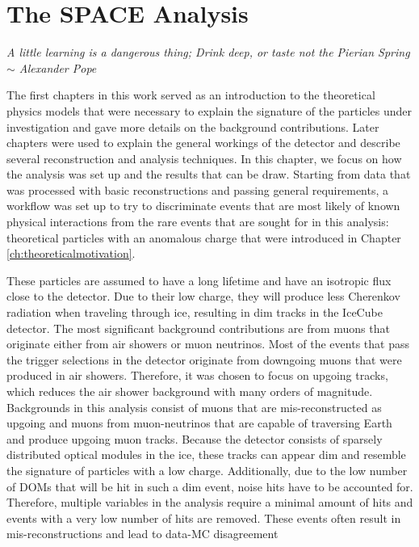 \chapter{The SPACE Analysis}
\label{ch:space}
\begin{flushright}
\textit{A little learning is a dangerous thing; Drink deep, or taste not the Pierian Spring \\$\sim$ Alexander Pope}
\end{flushright}

\noindent The first chapters in this work served as an introduction to the theoretical physics models that were necessary to explain the signature of the particles under investigation and gave more details on the background contributions. Later chapters were used to explain the general workings of the detector and describe several reconstruction and analysis techniques. In this chapter, we focus on how the analysis was set up and the results that can be draw. Starting from data that was processed with basic reconstructions and passing general requirements, a workflow was set up to try to discriminate events that are most likely of known physical interactions from the rare events that are sought for in this analysis: theoretical particles with an anomalous charge that were introduced in Chapter \ref{ch:theoreticalmotivation}. 

These particles are assumed to have a long lifetime and have an isotropic flux close to the detector. Due to their low charge, they will produce less Cherenkov radiation when traveling through ice, resulting in dim tracks in the IceCube detector. The most significant background contributions are from muons that originate either from air showers or muon neutrinos. Most of the events that pass the trigger selections in the detector originate from downgoing muons that were produced in air showers. Therefore, it was chosen to focus on upgoing tracks, which reduces the air shower background with many orders of magnitude. Backgrounds in this analysis consist of muons that are mis-reconstructed as upgoing and muons from muon-neutrinos that are capable of traversing Earth and produce upgoing muon tracks. Because the detector consists of sparsely distributed optical modules in the ice, these tracks can appear dim and resemble the signature of particles with a low charge.
Additionally, due to the low number of DOMs that will be hit in such a dim event, noise hits have to be accounted for. Therefore, multiple variables in the analysis require a minimal amount of hits and events with a very low number of hits are removed. These events often result in mis-reconstructions and lead to data-MC disagreement\\

